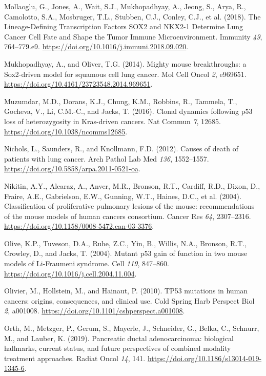 \begin{CSLReferences}{0}{0}
\leavevmode{}%
Mollaoglu, G., Jones, A., Wait, S.J., Mukhopadhyay, A., Jeong, S., Arya, R., Camolotto, S.A., Mosbruger, T.L., Stubben, C.J., Conley, C.J., et al. (2018). The Lineage-Defining Transcription Factors SOX2 and NKX2-1 Determine Lung Cancer Cell Fate and Shape the Tumor Immune Microenvironment. Immunity \emph{49}, 764--779.e9. \url{https://doi.org/10.1016/j.immuni.2018.09.020}.

\leavevmode{}%
Mukhopadhyay, A., and Oliver, T.G. (2014). Mighty mouse breakthroughs: a Sox2-driven model for squamous cell lung cancer. Mol Cell Oncol \emph{2}, e969651. \url{https://doi.org/10.4161/23723548.2014.969651}.

\leavevmode{}%
Muzumdar, M.D., Dorans, K.J., Chung, K.M., Robbins, R., Tammela, T., Gocheva, V., Li, C.M.-C., and Jacks, T. (2016). Clonal dynamics following p53 loss of heterozygosity in Kras-driven cancers. Nat Commun \emph{7}, 12685. \url{https://doi.org/10.1038/ncomms12685}.

\leavevmode{}%
Nichols, L., Saunders, R., and Knollmann, F.D. (2012). Causes of death of patients with lung cancer. Arch Pathol Lab Med \emph{136}, 1552--1557. \url{https://doi.org/10.5858/arpa.2011-0521-oa}.

\leavevmode{}%
Nikitin, A.Y., Alcaraz, A., Anver, M.R., Bronson, R.T., Cardiff, R.D., Dixon, D., Fraire, A.E., Gabrielson, E.W., Gunning, W.T., Haines, D.C., et al. (2004). Classification of proliferative pulmonary lesions of the mouse: recommendations of the mouse models of human cancers consortium. Cancer Res \emph{64}, 2307--2316. \url{https://doi.org/10.1158/0008-5472.can-03-3376}.

\leavevmode{}%
Olive, K.P., Tuveson, D.A., Ruhe, Z.C., Yin, B., Willis, N.A., Bronson, R.T., Crowley, D., and Jacks, T. (2004). Mutant p53 gain of function in two mouse models of Li-Fraumeni syndrome. Cell \emph{119}, 847--860. \url{https://doi.org/10.1016/j.cell.2004.11.004}.

\leavevmode{}%
Olivier, M., Hollstein, M., and Hainaut, P. (2010). TP53 mutations in human cancers: origins, consequences, and clinical use. Cold Spring Harb Perspect Biol \emph{2}, a001008. \url{https://doi.org/10.1101/cshperspect.a001008}.

\leavevmode{}%
Orth, M., Metzger, P., Gerum, S., Mayerle, J., Schneider, G., Belka, C., Schnurr, M., and Lauber, K. (2019). Pancreatic ductal adenocarcinoma: biological hallmarks, current status, and future perspectives of combined modality treatment approaches. Radiat Oncol \emph{14}, 141. \url{https://doi.org/10.1186/s13014-019-1345-6}.


\end{CSLReferences}
